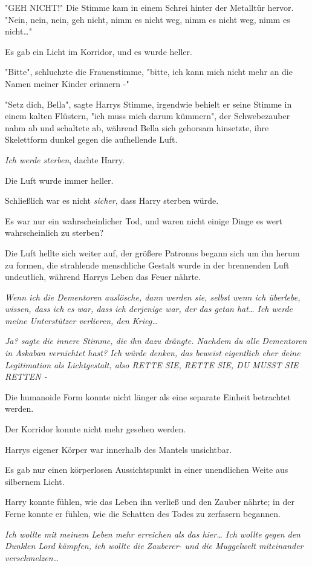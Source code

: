 {"GEH NICHT!" Die Stimme kam in einem Schrei hinter der Metalltür hervor. "Nein, nein, nein, geh nicht, nimm es nicht weg, nimm es nicht weg, nimm es nicht…"

Es gab ein Licht im Korridor, und es wurde heller.

"Bitte", schluchzte die Frauenstimme, "bitte, ich kann mich nicht mehr an die Namen meiner Kinder erinnern -"

"Setz dich, Bella", sagte Harrys Stimme, irgendwie behielt er seine Stimme in einem kalten Flüstern, "ich muss mich darum kümmern", der Schwebezauber nahm ab und schaltete ab, während Bella sich gehorsam hinsetzte, ihre Skelettform dunkel gegen die aufhellende Luft.

\emph{Ich werde sterben}, dachte Harry.

Die Luft wurde immer heller.

Schließlich war es nicht \emph{sicher}, dass Harry sterben würde.

Es war nur ein wahrscheinlicher Tod, und waren nicht einige Dinge es wert wahrscheinlich zu sterben?

Die Luft hellte sich weiter auf, der größere Patronus begann sich um ihn herum zu formen, die strahlende menschliche Gestalt wurde in der brennenden Luft undeutlich, während Harrys Leben das Feuer nährte.

\emph{Wenn ich die Dementoren auslösche, dann werden sie, selbst wenn ich überlebe, wissen, dass ich es war, dass ich derjenige war, der das getan hat… Ich werde meine Unterstützer verlieren, den Krieg…}

\emph{\emph{Ja?} sagte die innere Stimme, die ihn dazu drängte. \emph{Nachdem du alle Dementoren in Askaban vernichtet hast? Ich würde denken, das beweist eigentlich eher deine Legitimation als Lichtgestalt, also RETTE SIE, RETTE SIE, DU MUSST SIE RETTEN -}}

Die humanoide Form konnte nicht länger als eine separate Einheit betrachtet werden.

Der Korridor konnte nicht mehr gesehen werden.

Harrys eigener Körper war innerhalb des Mantels unsichtbar.

Es gab nur einen körperlosen Aussichtspunkt in einer unendlichen Weite aus silbernem Licht.

Harry konnte fühlen, wie das Leben ihn verließ und den Zauber nährte; in der Ferne konnte er fühlen, wie die Schatten des Todes zu zerfasern begannen.

\emph{Ich wollte mit meinem Leben mehr erreichen als das hier… Ich wollte gegen den Dunklen Lord kämpfen, ich wollte die Zauberer- und die Muggelwelt miteinander verschmelzen…}

}
